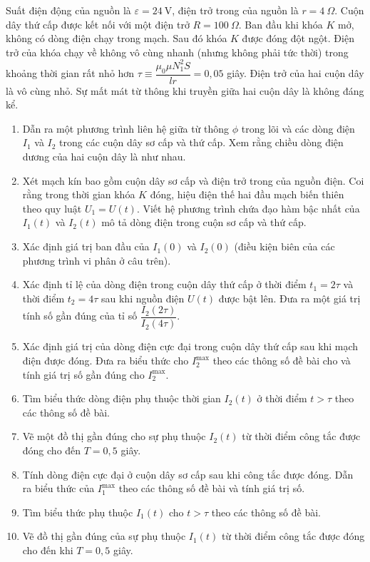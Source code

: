 \begin{vd}
Suất điện động của nguồn là $\varepsilon = 24~\mathrm{V}$, điện trở trong của nguồn là $r= 4~ \Omega.$ Cuộn dây thứ cấp được kết nối với một điện trở $R= 100~ \Omega$. Ban đầu khi khóa $K$ mở, không có dòng điện chạy trong mạch. Sau đó khóa $K$ được đóng đột ngột. Điện trở của khóa chạy về không vô cùng nhanh (nhưng không phải tức thời) trong khoảng thời gian rất nhỏ hơn $\tau \equiv \dfrac{\mu_0 \mu N_1^2 S}{lr}= 0,05$ giây. Điện trở của hai cuộn dây là vô cùng nhỏ. Sự mất mát từ thông khi truyền giữa hai cuộn dây là không đáng kể.
\begin{enumerate}[1)]
\item Dẫn ra một phương trình liên hệ giữa từ thông $\phi$ trong lõi và các dòng điện $I_1$ và $I_2$ trong các cuộn dây sơ cấp và thứ cấp. Xem rằng chiều dòng điện dương của hai cuộn dây là như nhau.
\item Xét mạch kín bao gồm cuộn dây sơ cấp và điện trở trong của nguồn điện. Coi rằng trong thời gian khóa $K$ đóng, hiệu điện thế hai đầu mạch biến thiên theo quy luật $U_1 = U(t)$. Viết hệ phương trình chứa đạo hàm bậc nhất của $I_1(t)$ và $I_2(t)$ mô tả dòng điện trong cuộn sơ cấp và thứ cấp.
\item Xác định giá trị ban đầu của $I_1(0)$ và $I_2(0)$ (điều kiện biên của các phương trình vi phân ở câu trên).
\item Xác định tỉ lệ của dòng điện trong cuộn dây thứ cấp ở thời điểm $t_1 = 2\tau$ và thời điểm $t_2 = 4\tau$ sau khi nguồn điện $U(t)$ được bật lên. Đưa ra một giá trị tính số gần đúng của tỉ số $\dfrac{I_2(2\tau)}{I_2 (4\tau)}$.
\item Xác định giá trị của dòng điện cực đại trong cuộn dây thứ cấp sau khi mạch điện được đóng. Đưa ra biểu thức cho $I_{2}^{\max}$ theo các thông số đề bài cho và tính giá trị số gần đúng cho $I_{2}^{\max}$.
\item Tìm biểu thức dòng điện phụ thuộc thời gian $I_2(t)$ ở thời điểm $t>\tau$ theo các thông số đề bài.
\item Vẽ một đồ thị gần đúng cho sự phụ thuộc $I_2(t)$ từ thời điểm công tắc được đóng cho đến $T= 0,5$ giây.
\item Tính dòng điện cực đại ở cuộn dây sơ cấp sau khi công tắc được đóng. Dẫn ra biểu thức của $I_{1}^{\max}$ theo các thông số đề bài và tính giá trị số.
\item Tìm biểu thức phụ thuộc $I_1(t)$ cho $t>\tau$ theo các thông số đề bài.
\item Vẽ đồ thị gần đúng của sự phụ thuộc $I_1(t)$ từ thời điểm công tắc được đóng cho đến khi $T= 0,5$ giây.
\end{enumerate}
\end{vd}


